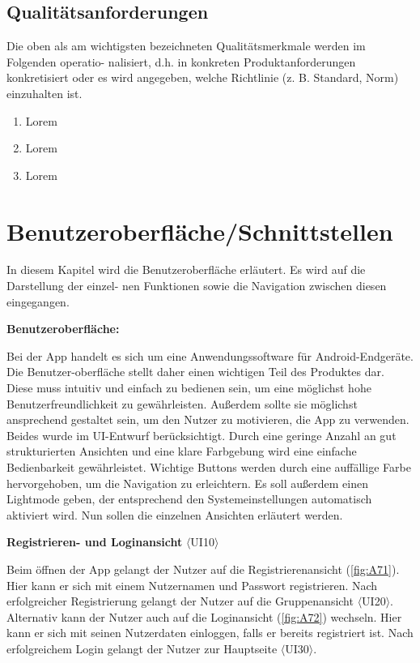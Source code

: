 \documentclass[parskip=full]{scrartcl}
\begin{document}
\subsection{Qualitätsanforderungen}
Die oben als am wichtigsten bezeichneten Qualitätsmerkmale werden im Folgenden operatio- nalisiert, d.h. in konkreten Produktanforderungen konkretisiert oder es wird angegeben, welche Richtlinie (z. B. Standard, Norm) einzuhalten ist.

\begin{enumerate}[start=1,label={$\langle$\bfseries Q\arabic*$\rangle$}, leftmargin = 5em, itemsep=4pt, parsep=4pt]
    \item Lorem
    \item Lorem
    \item Lorem
\end{enumerate}

\section{Benutzeroberfläche/Schnittstellen}
In diesem Kapitel wird die Benutzeroberfläche erläutert. Es wird auf die Darstellung der einzel- nen Funktionen sowie die Navigation zwischen diesen eingegangen.

\textbf{Benutzeroberfläche:}

Bei der App handelt es sich um eine Anwendungssoftware für Android-Endgeräte. Die Benutzer-oberfläche stellt daher einen wichtigen Teil des Produktes dar. Diese muss intuitiv und einfach zu bedienen sein, um eine möglichst hohe Benutzerfreundlichkeit zu gewährleisten. Außerdem sollte sie möglichst ansprechend gestaltet sein, um den Nutzer zu motivieren, die App zu verwenden. Beides wurde im UI-Entwurf berücksichtigt. Durch eine geringe Anzahl an gut strukturierten Ansichten und eine klare Farbgebung wird eine einfache Bedienbarkeit gewährleistet. Wichtige Buttons werden durch eine auffällige Farbe hervorgehoben, um die Navigation zu erleichtern. Es soll außerdem einen Lightmode geben, der entsprechend den Systemeinstellungen automatisch aktiviert wird. Nun sollen die einzelnen Ansichten erläutert werden.

\textbf{Registrieren- und Loginansicht} $\langle$UI10$\rangle$

Beim öffnen der App gelangt der Nutzer auf die Registrierenansicht (\ref{fig:A71}). Hier kann er sich mit einem Nutzernamen und Passwort registrieren. Nach erfolgreicher Registrierung gelangt der Nutzer auf die Gruppenansicht $\langle$UI20$\rangle$. Alternativ kann der Nutzer auch auf die Loginansicht (\ref{fig:A72}) wechseln. Hier kann er sich mit seinen Nutzerdaten einloggen, falls er bereits registriert ist. Nach erfolgreichem Login gelangt der Nutzer zur Hauptseite $\langle$UI30$\rangle$.
\end{document}
